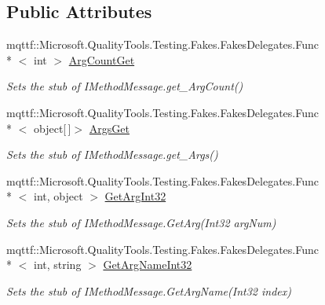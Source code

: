 \subsection*{Public Attributes}
\begin{DoxyCompactItemize}
\item 
mqttf\-::\-Microsoft.\-Quality\-Tools.\-Testing.\-Fakes.\-Fakes\-Delegates.\-Func\\*
$<$ int $>$ \hyperlink{class_system_1_1_runtime_1_1_remoting_1_1_messaging_1_1_fakes_1_1_stub_i_method_message_aa13f4a4d2c0c011ecf30e90b7ce88e7a}{Arg\-Count\-Get}
\begin{DoxyCompactList}\small\item\em Sets the stub of I\-Method\-Message.\-get\-\_\-\-Arg\-Count()\end{DoxyCompactList}\item 
mqttf\-::\-Microsoft.\-Quality\-Tools.\-Testing.\-Fakes.\-Fakes\-Delegates.\-Func\\*
$<$ object\mbox{[}$\,$\mbox{]}$>$ \hyperlink{class_system_1_1_runtime_1_1_remoting_1_1_messaging_1_1_fakes_1_1_stub_i_method_message_aa3eea5de375e507aac6d4fc5c245c1cb}{Args\-Get}
\begin{DoxyCompactList}\small\item\em Sets the stub of I\-Method\-Message.\-get\-\_\-\-Args()\end{DoxyCompactList}\item 
mqttf\-::\-Microsoft.\-Quality\-Tools.\-Testing.\-Fakes.\-Fakes\-Delegates.\-Func\\*
$<$ int, object $>$ \hyperlink{class_system_1_1_runtime_1_1_remoting_1_1_messaging_1_1_fakes_1_1_stub_i_method_message_a4b458ee489110660b6ef7eaeeef2c796}{Get\-Arg\-Int32}
\begin{DoxyCompactList}\small\item\em Sets the stub of I\-Method\-Message.\-Get\-Arg(\-Int32 arg\-Num)\end{DoxyCompactList}\item 
mqttf\-::\-Microsoft.\-Quality\-Tools.\-Testing.\-Fakes.\-Fakes\-Delegates.\-Func\\*
$<$ int, string $>$ \hyperlink{class_system_1_1_runtime_1_1_remoting_1_1_messaging_1_1_fakes_1_1_stub_i_method_message_a946a7ef91e0a97b88cc9e12cc0a2deca}{Get\-Arg\-Name\-Int32}
\begin{DoxyCompactList}\small\item\em Sets the stub of I\-Method\-Message.\-Get\-Arg\-Name(\-Int32 index)\end{DoxyCompactList}\item 

\end{DoxyCompactItemize}
